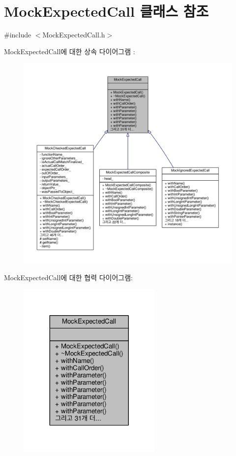 \hypertarget{class_mock_expected_call}{}\section{Mock\+Expected\+Call 클래스 참조}
\label{class_mock_expected_call}


{\ttfamily \#include $<$Mock\+Expected\+Call.\+h$>$}



Mock\+Expected\+Call에 대한 상속 다이어그램 \+: 
\nopagebreak
\begin{figure}[H]
\begin{center}
\leavevmode
\includegraphics[width=350pt]{class_mock_expected_call__inherit__graph}
\end{center}
\end{figure}


Mock\+Expected\+Call에 대한 협력 다이어그램\+:
\nopagebreak
\begin{figure}[H]
\begin{center}
\leavevmode
\includegraphics[width=200pt]{class_mock_expected_call__coll__graph}
\end{center}
\end{figure}
